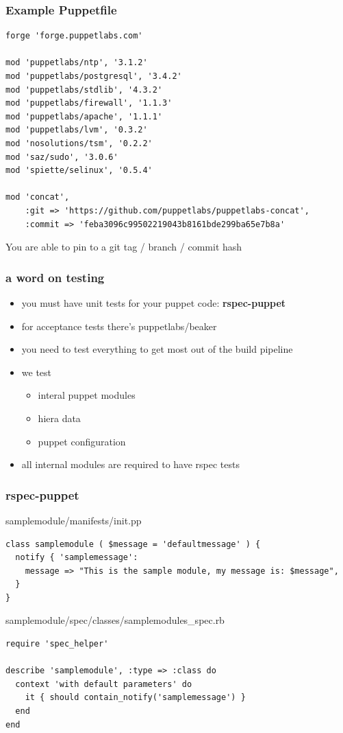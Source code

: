 \documentclass{beamer}
\begin{document}
  \begin{frame}[fragile]
    \frametitle{Example Puppetfile}
\begin{lstlisting}
forge 'forge.puppetlabs.com'

mod 'puppetlabs/ntp', '3.1.2'
mod 'puppetlabs/postgresql', '3.4.2'
mod 'puppetlabs/stdlib', '4.3.2'
mod 'puppetlabs/firewall', '1.1.3'
mod 'puppetlabs/apache', '1.1.1'
mod 'puppetlabs/lvm', '0.3.2'
mod 'nosolutions/tsm', '0.2.2'
mod 'saz/sudo', '3.0.6'
mod 'spiette/selinux', '0.5.4'

mod 'concat',
    :git => 'https://github.com/puppetlabs/puppetlabs-concat',
    :commit => 'feba3096c99502219043b8161bde299ba65e7b8a'
\end{lstlisting}

    You are able to pin to a git tag / branch / commit hash

\end{frame}

\begin{frame}
  \frametitle{a word on testing}

  \begin{itemize}
  \item you must have unit tests for your puppet code: \textbf{rspec-puppet}
  \item for acceptance tests there's puppetlabs/beaker
  \item you need to test everything to get most out of the build
    pipeline
  \item we test
    \begin{itemize}
    \item interal puppet modules
    \item hiera data
    \item puppet configuration
    \end{itemize}
    \item all internal modules are required to have rspec tests
  \end{itemize}
\end{frame}

\begin{frame}
  \frametitle{rspec-puppet}

  samplemodule/manifests/init.pp

\begin{lstlisting}
class samplemodule ( $message = 'defaultmessage' ) {
  notify { 'samplemessage':
    message => "This is the sample module, my message is: $message",
  }
}
\end{lstlisting}

  samplemodule/spec/classes/samplemodules\_spec.rb

  \begin{lstlisting}
require 'spec_helper'

describe 'samplemodule', :type => :class do
  context 'with default parameters' do
    it { should contain_notify('samplemessage') }
  end
end
  \end{lstlisting}

\end{frame}
\end{document}
